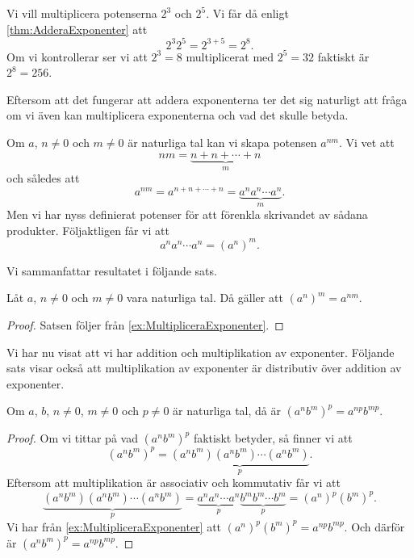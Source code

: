 \begin{example}
  Vi vill multiplicera potenserna \(2^3\) och \(2^5\).
  Vi får då enligt \cref{thm:AdderaExponenter} att
  \begin{equation*}
    2^3 2^5 = 2^{3+5} = 2^8.
  \end{equation*}
  Om vi kontrollerar ser vi att \(2^3=8\) multiplicerat med \(2^5=32\)
  faktiskt är \(2^8=256\).
\end{example}

Eftersom att det fungerar att addera exponenterna ter det sig naturligt att
fråga om vi även kan multiplicera exponenterna och vad det skulle betyda.
\begin{example}\label{ex:MultipliceraExponenter}
  Om \(a\), \(n\neq 0\) och \(m\neq 0\) är naturliga tal kan vi skapa
  potensen \(a^{nm}\).
  Vi vet att \[nm = \underbrace{n+n+\cdots+n}_m\] och således att
  \begin{equation}
    \label{eq:MultipliceraExponenter1}
    a^{nm}=a^{n+n+\cdots+n}=\underbrace{a^n a^n\cdots a^n}_m.
  \end{equation}
  Men vi har nyss definierat potenser för att förenkla skrivandet av sådana
  produkter.
  Följaktligen får vi att
  \begin{equation}
    \label{eq:MultipliceraExponenter2}
    a^n a^n\cdots a^n = (a^n)^m.
  \end{equation}
\end{example}
Vi sammanfattar resultatet i följande sats.
\begin{theorem}
  Låt \(a\), \(n\neq 0\) och \(m\neq 0\) vara naturliga tal.
  Då gäller att \((a^n)^m = a^{nm}\).
\end{theorem}
\begin{proof}
  Satsen följer från \cref{ex:MultipliceraExponenter}.
\end{proof}

Vi har nu visat att vi har addition och multiplikation av exponenter.
Följande sats visar också att multiplikation av exponenter är distributiv över
addition av exponenter.
\begin{theorem}\label{thm:MultipliceraExponenter}
  Om \(a\), \(b\), \(n\neq 0\), \(m\neq 0\) och \(p\neq 0\) är naturliga tal,
  då är \((a^n b^m)^p = a^{np} b^{mp}\).
\end{theorem}
\begin{proof}
  Om vi tittar på vad \((a^n b^m)^p\) faktiskt betyder, så finner vi att
  \begin{equation*}
    (a^n b^m)^p = \underbrace{(a^n b^m)(a^n b^m)\cdots (a^n b^m)}_p.
  \end{equation*}
  Eftersom att multiplikation är associativ och kommutativ får vi att
  \begin{equation*}
    \underbrace{(a^n b^m)(a^n b^m)\cdots (a^n b^m)}_p =
    \underbrace{a^n a^n\cdots a^n}_p \underbrace{b^m b^m\cdots b^m}_p =
    (a^n)^p (b^m)^p.
  \end{equation*}
  Vi har från \cref{ex:MultipliceraExponenter} att \((a^n)^p(b^m)^p =
  a^{np}b^{mp}\).
  Och därför är \((a^n b^m)^p = a^{np} b^{mp}\).
\end{proof}

